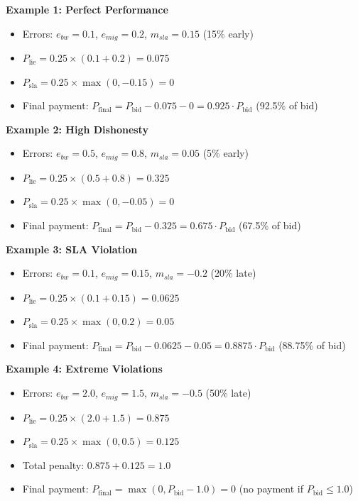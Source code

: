 \documentclass[12pt,a4paper]{article}
\begin{document}
\textbf{Example 1: Perfect Performance}
\begin{itemize}
    \item Errors: $e_{bw} = 0.1$, $e_{mig} = 0.2$, $m_{sla} = 0.15$ (15\% early)
    \item $P_{\text{lie}} = 0.25 \times (0.1 + 0.2) = 0.075$
    \item $P_{\text{sla}} = 0.25 \times \max(0, -0.15) = 0$
    \item Final payment: $P_{\text{final}} = P_{\text{bid}} - 0.075 - 0 = 0.925 \cdot P_{\text{bid}}$ (92.5\% of bid)
\end{itemize}

\textbf{Example 2: High Dishonesty}
\begin{itemize}
    \item Errors: $e_{bw} = 0.5$, $e_{mig} = 0.8$, $m_{sla} = 0.05$ (5\% early)
    \item $P_{\text{lie}} = 0.25 \times (0.5 + 0.8) = 0.325$
    \item $P_{\text{sla}} = 0.25 \times \max(0, -0.05) = 0$
    \item Final payment: $P_{\text{final}} = P_{\text{bid}} - 0.325 = 0.675 \cdot P_{\text{bid}}$ (67.5\% of bid)
\end{itemize}

\textbf{Example 3: SLA Violation}
\begin{itemize}
    \item Errors: $e_{bw} = 0.1$, $e_{mig} = 0.15$, $m_{sla} = -0.2$ (20\% late)
    \item $P_{\text{lie}} = 0.25 \times (0.1 + 0.15) = 0.0625$
    \item $P_{\text{sla}} = 0.25 \times \max(0, 0.2) = 0.05$
    \item Final payment: $P_{\text{final}} = P_{\text{bid}} - 0.0625 - 0.05 = 0.8875 \cdot P_{\text{bid}}$ (88.75\% of bid)
\end{itemize}

\textbf{Example 4: Extreme Violations}
\begin{itemize}
    \item Errors: $e_{bw} = 2.0$, $e_{mig} = 1.5$, $m_{sla} = -0.5$ (50\% late)
    \item $P_{\text{lie}} = 0.25 \times (2.0 + 1.5) = 0.875$
    \item $P_{\text{sla}} = 0.25 \times \max(0, 0.5) = 0.125$
    \item Total penalty: $0.875 + 0.125 = 1.0$
    \item Final payment: $P_{\text{final}} = \max(0, P_{\text{bid}} - 1.0) = 0$ (no payment if $P_{\text{bid}} \leq 1.0$)
\end{itemize}
\end{document}
